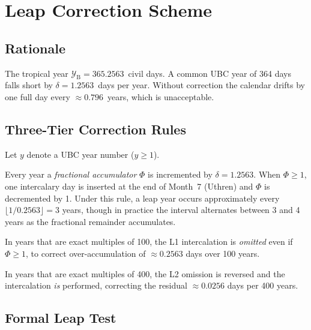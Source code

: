 \documentclass[journal,twoside]{IEEEtran}
\begin{document}
\section{Leap Correction Scheme}
\label{sec:leap}

\subsection{Rationale}

The tropical year $\mathcal{Y}_{\mathrm{B}} = 365.2563$~civil days.  A common UBC year
of 364 days falls short by $\delta = 1.2563$~days per year.  Without correction the
calendar drifts by one full day every $\approx 0.796$~years, which is unacceptable.

\subsection{Three-Tier Correction Rules}

Let $y$ denote a UBC year number ($y \geq 1$).

\begin{description}[style=nextline, leftmargin=0pt, font=\normalfont\bfseries]
  \item[Rule L1 (Annual Intercalation)]
    Every year a \emph{fractional accumulator} $\Phi$ is incremented by
    $\delta = 1.2563$.  When $\Phi \geq 1$, one intercalary day is inserted at
    the end of Month~7 (Uthren) and $\Phi$ is decremented by 1.
    Under this rule, a leap year occurs approximately every
    $\lfloor 1/0.2563 \rfloor = 3$ years, though in practice the interval
    alternates between 3 and 4 years as the fractional remainder accumulates.

  \item[Rule L2 (Century Omission)]
    In years that are exact multiples of 100, the L1 intercalation is
    \emph{omitted} even if $\Phi \geq 1$, to correct over-accumulation of $\approx 0.2563$
    days over 100 years.

  \item[Rule L3 (Quad-Century Restoration)]
    In years that are exact multiples of 400, the L2 omission is reversed and
    the intercalation \emph{is} performed, correcting the residual $\approx 0.0256$
    days per 400 years.
\end{description}

\subsection{Formal Leap Test}
\end{document}
